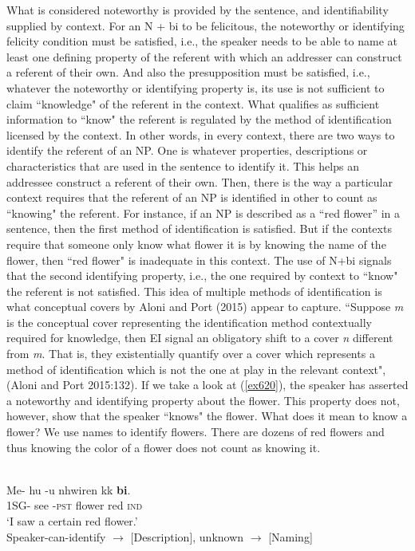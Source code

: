\documentclass[output=paper,
modfonts
]{langsci/langscibook}
\begin{document}
 \z\z What is considered noteworthy is provided by the sentence, and identifiability supplied by context. 
For an N + bi to be felicitous, the noteworthy or identifying felicity condition must be satisfied, i.e., the speaker needs to be able to name at least one defining property of the referent with which an addresser can construct a referent of their own. And also the presupposition must be satisfied, i.e., whatever the noteworthy or identifying property is, its use is not sufficient to claim ``knowledge" of the referent in the context. What qualifies as sufficient information to ``know" the referent is regulated by the method of identification licensed by the context. In other words, in every context, there are two ways to identify the referent of an NP. One is whatever properties, descriptions or characteristics that are used in the sentence to identify it. This helps an addressee construct a referent of their own. Then, there is the way a particular context requires that the referent of an NP is identified in other to count as ``knowing" the referent. For instance, if an NP is described as a ``red flower'' in a sentence, then the first method of identification is satisfied. But if the contexts require that someone only know what flower it is by knowing the name of the flower, then ``red flower" is inadequate in this context. The use of N+bi signals that the second identifying property, i.e., the one required by context to ``know" the referent is not satisfied. This idea of multiple methods of identification is what conceptual covers by Aloni and Port (2015) appear to capture. ``Suppose \emph{m} is the conceptual cover representing the identification method contextually required for knowledge, then EI signal an obligatory shift to a cover \emph{n} different from \emph{m}. That is, they existentially quantify over a cover which represents a method of identification which is not the one at play in the relevant context", (Aloni and Port 2015:132). 
If we take a look at (\ref{ex620}), the speaker has asserted a noteworthy and identifying property about the flower.  This property does not, however, show that the speaker ``knows" the flower. What does it mean to know a flower? We use names to identify flowers. There are dozens of red flowers and thus knowing the color of a flower does not count as knowing it. 


\ea\label{ex620}\\
\gll Me- hu -u nhwiren kk \textbf{bi}.\\
 1SG- see -\textsc{pst}  flower red \textsc{ind} \\
\glt `I saw a certain red flower.'\\
Speaker-can-identify $\rightarrow$ [Description], unknown $\rightarrow$  [Naming]
\end{document}
